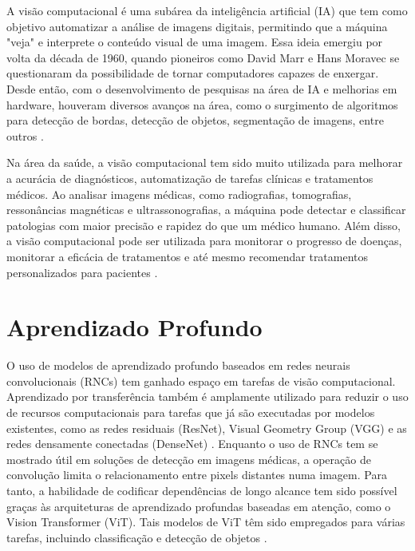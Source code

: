 A visão computacional é uma subárea da inteligência artificial (IA) que tem como objetivo automatizar a análise de imagens digitais, permitindo que a máquina "veja" e interprete o conteúdo visual de uma imagem. Essa ideia emergiu por volta da década de 1960, quando pioneiros como David Marr e Hans Moravec se questionaram da possibilidade de tornar computadores capazes de enxergar. Desde então, com o desenvolvimento de pesquisas na área de IA e melhorias em hardware, houveram diversos avanços na área, como o surgimento de algoritmos para detecção de bordas, detecção de objetos, segmentação de imagens, entre outros \cite{huggingface2024}.

Na área da saúde, a visão computacional tem sido muito utilizada para melhorar a acurácia de diagnósticos, automatização de tarefas clínicas e tratamentos médicos. Ao analisar imagens médicas, como radiografias, tomografias, ressonâncias magnéticas e ultrassonografias, a máquina pode detectar e classificar patologias com maior precisão e rapidez do que um médico humano. Além disso, a visão computacional pode ser utilizada para monitorar o progresso de doenças, monitorar a eficácia de tratamentos e até mesmo recomendar tratamentos personalizados para pacientes \cite{JAVAID2024792}.

\section{Aprendizado Profundo}\label{sec:aprendizado-profundo}

O uso de modelos de aprendizado profundo baseados em redes neurais convolucionais (RNCs) tem ganhado espaço em tarefas de visão computacional. Aprendizado por transferência também é amplamente utilizado para reduzir o uso de recursos computacionais para tarefas que já são executadas por modelos existentes, como as redes residuais (ResNet), Visual Geometry Group (VGG) e as redes densamente conectadas (DenseNet) \cite{Tariq2023}. Enquanto o uso de RNCs tem se mostrado útil em soluções de detecção em imagens médicas, a operação de convolução limita o relacionamento entre pixels distantes numa imagem. Para tanto, a habilidade de codificar dependências de longo alcance tem sido possível graças às arquiteturas de aprendizado profundas baseadas em atenção, como o Vision Transformer (ViT). Tais modelos de ViT têm sido empregados para várias tarefas, incluindo classificação e detecção de objetos \cite{Shamshad2023}.

